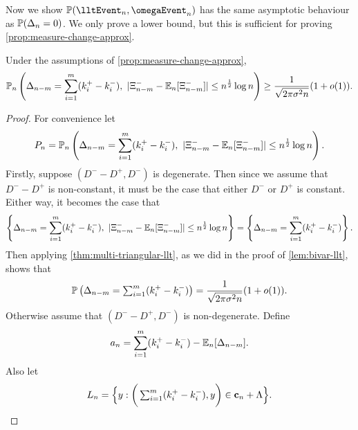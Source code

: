 Now we show $\P(\lltEvent_n, \omegaEvent_n)$ has the same asymptotic behaviour as $\P(\Delta_n = 0)$. We only prove a lower bound, but this is sufficient for proving \cref{prop:measure-change-approx}.
\begin{lemma}
    \label{lem:mod-dev-local}
    Under the assumptions of \cref{prop:measure-change-approx},
    \begin{equation*}
        \mathbb P_n \left(
            \Delta_{n-m} = \sum_{i=1}^m (k_i^+ - k_i^-), \ 
            \abs{\Xi^-_{n-m} - \E_n[\Xi^-_{n-m}]} \leq n^{\frac{1}{2}} \log n
        \right)
        \geq \frac{1}{\sqrt{2 \pi \sigma^2 n}} (1 + \littleo(1)).
    \end{equation*}
\end{lemma}
\begin{proof}
    For convenience let
    \begin{equation*}
        P_n = \mathbb P_n \left(
            \Delta_{n-m} = \sum_{i=1}^m (k_i^+ - k_i^-), \ 
            \abs{\Xi^-_{n-m} - \E_n[\Xi^-_{n-m}]} \leq n^{\frac{1}{2}} \log n
        \right).
    \end{equation*}
    Firstly, suppose $(D^- - D^+, D^-)$ is degenerate. Then since we assume that $D^- - D^+$ is non-constant, it must be the case that either $D^-$ or $D^+$ is constant. Either way, it becomes the case that
    \begin{equation*}
        \left\{
            \Delta_{n-m} = \sum_{i=1}^m (k_i^+ - k_i^-), \ 
            \abs{\Xi^-_{n-m} - \E_n[\Xi^-_{n-m}]} \leq n^{\frac{1}{2}} \log n
        \right\}
        =
        \left\{
            \Delta_{n-m} = \sum_{i=1}^m (k_i^+ - k_i^-)
        \right\}.
    \end{equation*}
    Then applying \cref{thm:multi-triangular-llt}, as we did in the proof of \cref{lem:bivar-llt}, shows that
    \begin{equation*}
        \P\left( 
            \Delta_{n-m} = \textstyle \sum_{i=1}^m (k_i^+ - k_i^-)
        \right) = \frac{1}{\sqrt{2 \pi \sigma^2 n}} (1 + \littleo(1)).
    \end{equation*}
    Otherwise assume that $(D^- - D^+, D^-)$ is non-degenerate. Define
    \begin{equation*}
        a_n = \sum_{i=1}^m (k_i^+ - k_i^-) - \E_n[\Delta_{n-m}].
    \end{equation*}
    Also let
    \begin{equation*}
        L_n = \Big\{
            y : \bigg( \textstyle\sum_{i=1}^m (k_i^+ - k_i^-), y \bigg) \in \vc_n + \lattice
            \Big\}.

\end{equation*}
\end{proof}
